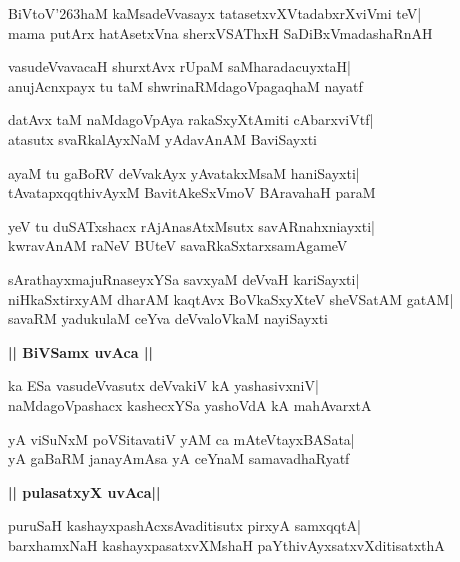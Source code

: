\documentclass[twoside,12pt,openright]{book}
\def\S{\char'263}
\newcounter{shloka}[chapter]
\def\uvaca#1{\centerline{{\large\textbf{#1}}}}
\begin{document}
\begin{shloka}%
BiVtoV\S haM kaMsadeVvasayx tatasetxvXVtadabxrXviVmi teV|\\
mama putArx hatAsetxVna sherxVSAThxH SaDiBxVmadashaRnAH
\end{shloka}

\begin{shloka}%
vasudeVvavacaH shurxtAvx rUpaM saMharadacuyxtaH|\\
anujAcnxpayx tu taM shwrinaRMdagoVpagaqhaM nayatf
\end{shloka}

\begin{shloka}%
datAvx taM naMdagoVpAya rakaSxyXtAmiti cAbarxviVtf|\\
atasutx svaRkalAyxNaM yAdavAnAM BaviSayxti
\end{shloka}

\begin{shloka}%
ayaM tu gaBoRV deVvakAyx yAvatakxMsaM haniSayxti|\\
tAvatapxqqthivAyxM BavitAkeSxVmoV BAravahaH paraM
\end{shloka}

\begin{shloka}%
yeV tu duSATxshacx rAjAnasAtxMsutx savARnahxniayxti|\\
kwravAnAM raNeV BUteV savaRkaSxtarxsamAgameV
\end{shloka}

\begin{shloka}%
sArathayxmajuRnaseyxYSa savxyaM deVvaH kariSayxti|\\
niHkaSxtirxyAM dharAM kaqtAvx BoVkaSxyXteV sheVSatAM gatAM|\\
savaRM yadukulaM ceYva deVvaloVkaM nayiSayxti
\end{shloka}

\uvaca{|| BiVSamx uvAca ||}
\begin{shloka}%
ka ESa vasudeVvasutx deVvakiV kA yashasivxniV|\\
naMdagoVpashacx kashecxYSa yashoVdA kA mahAvarxtA
\end{shloka}

\begin{shloka}%
yA viSuNxM poVSitavatiV yAM ca mAteVtayxBASata|\\
yA gaBaRM janayAmAsa yA ceYnaM samavadhaRyatf
\end{shloka}

\uvaca{|| pulasatxyX uvAca||}
\begin{shloka}%
puruSaH kashayxpashAcxsAvaditisutx pirxyA samxqqtA|\\
barxhamxNaH kashayxpasatxvXMshaH paYthivAyxsatxvXditisatxthA
\end{shloka}
\end{document}
